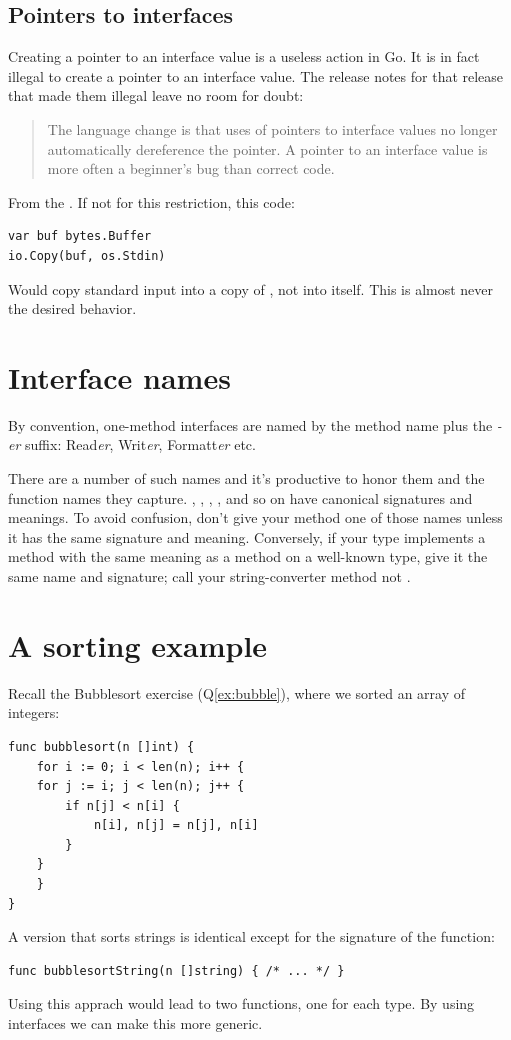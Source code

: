\subsection{Pointers to interfaces}
Creating a pointer to an interface value is a useless action in Go.
 It is in fact illegal to
create a pointer to an interface value. The release notes for that release that
made them illegal leave no room for doubt:
\begin{quote}
The language change is that uses of pointers to interface values no longer 
automatically dereference the pointer.  A pointer to an interface value is more 
often a beginner's bug than correct code.
\end{quote}
From the \cite{go_faq}.  If not for this restriction, this code:
\begin{lstlisting}
var buf bytes.Buffer
io.Copy(buf, os.Stdin)
\end{lstlisting}
Would copy standard input into a copy of , not into  itself. 
This is almost never the desired behavior.

\section{Interface names}
By convention, one-method interfaces are named by the method name plus
the \emph{-er} suffix: Read\emph{er}, Writ\emph{er}, Formatt\emph{er} etc.

There are a number of such names and it's productive to honor them and
the function names they capture. , ,
, ,  and
so on have canonical signatures and meanings. To avoid confusion, don't
give your method one of those names unless it has the same signature and
meaning. Conversely, if your type implements a method with the same
meaning as a method on a well-known type, give it the same name and
signature; call your string-converter method  not
.

\section{A sorting example}
\label{sec:a sorting example}
Recall the Bubblesort exercise (Q\ref{ex:bubble}), where we sorted an
array of integers:
\begin{lstlisting}
func bubblesort(n []int) {
    for i := 0; i < len(n); i++ {
	for j := i; j < len(n); j++ {
	    if n[j] < n[i] {
		    n[i], n[j] = n[j], n[i]
	    }
	}
    }
}
\end{lstlisting}
A version that sorts strings is identical except for the signature of
the function:
\begin{lstlisting}
func bubblesortString(n []string) { /* ... */ }
\end{lstlisting}
Using this apprach would lead to two functions, one for each type. By using
interfaces we can make this more  generic.

